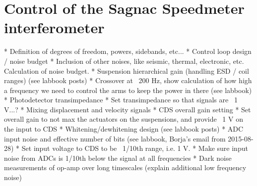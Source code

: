 \chapter{Control of the Sagnac Speedmeter interferometer}
\label{c:speedmeter-control}


    * Definition of degrees of freedom, powers, sidebands, etc...
    * Control loop design / noise budget
      * Inclusion of other noises, like seismic, thermal, electronic, etc. Calculation of noise budget.
      * Suspension hierarchical gain (handling ESD / coil ranges) (see labbook posts)
        * Crossover at ~200 Hz, show calculation of how high a frequency we need to control the arms to keep the power in there (see labbook)
      * Photodetector transimpedance
        * Set transimpedance so that signals are ~1 V...?
      * Mixing displacement and velocity signals
      * CDS overall gain setting
        * Set overall gain to not max the actuators on the suspensions, and provide ~1 V on the input to CDS
      * Whitening/dewhitening design (see labbook posts)
        * ADC input noise and effective number of bits (see labbook, Borja's email from 2015-08-28)
        * Set input voltage to CDS to be ~1/10th range, i.e. 1 V.
        * Make sure input noise from ADCs is 1/10th below the signal at all frequencies
    * Dark noise measurements of op-amp over long timescales (explain additional low frequency noise)